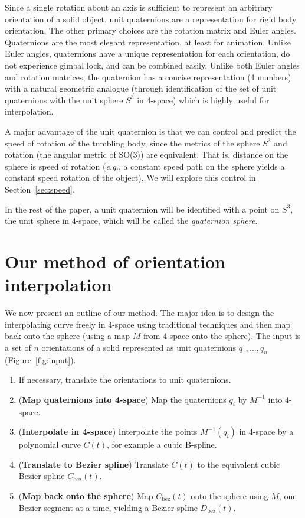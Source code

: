 Since a single rotation about an axis is sufficient
to represent an arbitrary orientation of a solid object,
unit quaternions are a representation for rigid body orientation.
The other primary choices are the rotation matrix and Euler angles.
Quaternions are the most elegant representation, at least for animation.
Unlike Euler angles, quaternions have a unique representation 
for each orientation, do not experience gimbal lock, and can be
combined easily.
Unlike both Euler angles and rotation matrices,
the quaternion has a concise representation (4 numbers) with a natural
geometric analogue (through identification of the set of unit quaternions 
with the unit sphere $S^3$ in 4-space) which is highly useful for interpolation.

A major advantage of the unit quaternion is that we can 
control and predict the speed of rotation of the tumbling body,
since the metrics of the sphere $S^3$ and rotation (the angular metric of
SO(3)) are equivalent.
That is, distance on the sphere is speed of rotation ({\em e.g.},
a constant speed path on the sphere yields a constant speed rotation
of the object).
We will explore this control in Section~\ref{sec:speed}.


In the rest of the paper, a unit quaternion will be identified
with a point on $S^3$, the unit sphere in 4-space, which will be
called the {\em quaternion sphere}.

\section{Our method of orientation interpolation}
\label{sec:method}

We now present an outline of our method.
The major idea is to design the interpolating curve freely in 4-space
using traditional techniques and then map back onto the sphere
(using a map $M$ from 4-space onto the sphere).
The input is a set of $n$ orientations of a solid
represented as unit quaternions $q_1,\ldots,q_n$ (Figure~\ref{fig:input}).

\clearpage

\begin{enumerate}
\item
	If necessary, translate the orientations to unit quaternions.
\item
	({\bf Map quaternions into 4-space})
	Map the quaternions $q_i$ by $M^{-1}$ into 4-space.
\item
	({\bf Interpolate in 4-space})
	Interpolate the points $M^{-1}(q_i)$ in 4-space
	by a polynomial curve $C(t)$, for example a cubic B-spline.
\item
	({\bf Translate to Bezier spline})
	Translate $C(t)$ to the equivalent cubic Bezier spline 
	$C_{\mbox{bez}}(t)$.
\item
	({\bf Map back onto the sphere})
	Map $C_{\mbox{bez}}(t)$ onto the sphere using $M$, 
	one Bezier segment at a time, yielding a  
	Bezier spline $D_{\mbox{bez}}(t)$. 
\end{enumerate}

